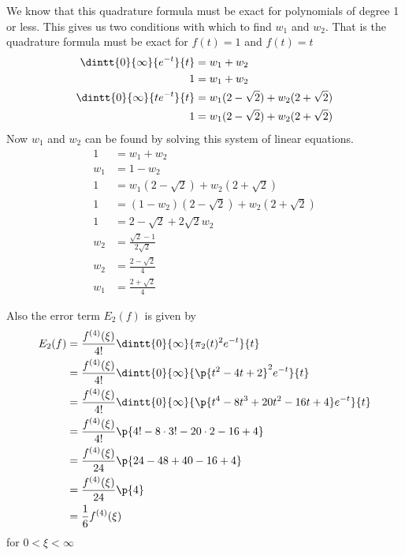 \documentclass[11pt]{article}
\begin{document}
\begin{enumerate}
\begin{enumerate}
                We know that this quadrature formula must be exact for
                polynomials of degree 1 or less.
                This gives us two conditions with which to find $w_1$ and $w_2$.
                That is the quadrature formula must be exact for $f(t) = 1$ and
                $f(t) = t$
                \begin{align*}
                    \dintt{0}{\infty}{e^{-t}}{t} &= w_1 + w_2 \\
                    1 &= w_1 + w_2 \\
                    \dintt{0}{\infty}{t e^{-t}}{t} &= w_1(2 - \sqrt{2})+ w_2(2 + \sqrt{2}) \\
                    1 &=  w_1(2 - \sqrt{2})+ w_2(2 + \sqrt{2}) \\
                \end{align*}
                Now $w_1$ and $w_2$ can be found by solving this system of
                linear equations.
                \begin{align*}
                    1 &= w_1 + w_2 \\
                    w_1 &= 1 - w_2 \\
                    1 &=  w_1(2 - \sqrt{2})+ w_2(2 + \sqrt{2}) \\
                    1 &=  (1 - w_2)(2 - \sqrt{2})+ w_2(2 + \sqrt{2}) \\
                    1 &= 2 - \sqrt{2} + 2\sqrt{2} w_2 \\
                    w_2 &= \frac{\sqrt{2} - 1}{2\sqrt{2}} \\
                    w_2 &= \frac{2 - \sqrt{2}}{4} \\
                    w_1 &= \frac{2 + \sqrt{2}}{4}
                \end{align*}

                Also the error term $E_2(f)$ is given by
                \begin{align*}
                    E_2(f) &= \frac{f^{(4)}(\xi)}{4!} \dintt{0}{\infty}{\pi_2(t)^2 e^{-t}}{t} \\
                    &= \frac{f^{(4)}(\xi)}{4!} \dintt{0}{\infty}{\p{t^2 - 4t + 2}^2 e^{-t}}{t} \\
                    &= \frac{f^{(4)}(\xi)}{4!} \dintt{0}{\infty}{\p{t^4 - 8t^3 + 20t^2 - 16t + 4} e^{-t}}{t} \\
                    &= \frac{f^{(4)}(\xi)}{4!} \p{4! - 8\cdot3! - 20\cdot2 - 16 + 4} \\
                    &= \frac{f^{(4)}(\xi)}{24} \p{24 - 48 + 40 - 16 + 4} \\
                    &= \frac{f^{(4)}(\xi)}{24} \p{4} \\
                    &= \frac{1}{6} f^{(4)}(\xi) \\
                \end{align*}
                for $0 < \xi < \infty$


\end{enumerate}
\end{enumerate}
\end{document}
